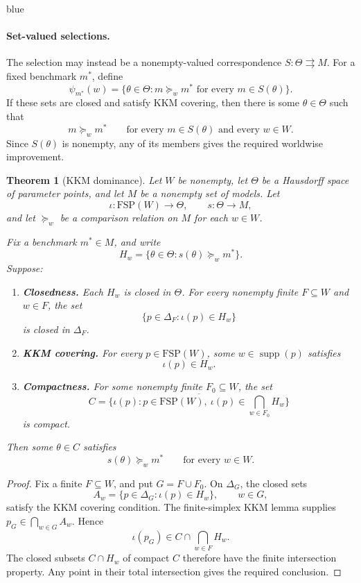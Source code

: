 \documentclass[11pt]{article}
\newtheorem{theorem}{Theorem}[section]
\theoremstyle{definition}
\theoremstyle{remark}
\newcommand{\supp}{\operatorname{supp}}
\newenvironment{AIwritten}{\begin{color}{blue}}{\end{color}}
\begin{document}
\begin{AIwritten}
\paragraph{Set-valued selections.}
The selection may instead be a nonempty-valued
correspondence $S:\Theta\rightrightarrows M$.
For a fixed benchmark $m^*$, define
\[
\psi_{m^*}(w)=
\{\theta\in \Theta:
m\succeq_w m^*
\text{ for every }m\in S(\theta)\}.
\]
If these sets are closed and satisfy KKM covering,
then there is some $\theta\in \Theta$ such that
\[
m\succeq_w m^*
\qquad
\text{for every }m\in S(\theta)
\text{ and every }w\in W.
\]
Since $S(\theta)$ is nonempty, any of its members gives
the required worldwise improvement.



\begin{theorem}[KKM dominance]\label{thm:dom}
	Let $W$ be nonempty, let $\Theta$ be a Hausdorff
	space of parameter points, and let $M$ be a
	nonempty set of models.
	Let
	\[
	\iota:\mathrm{FSP}(W)\to \Theta,
	\qquad s:\Theta\to M,
	\]
	and let $\succeq_w$ be a comparison relation on $M$
	for each $w\in W$.
	
	Fix a benchmark $m^*\in M$, and write
	\[
	H_w=\{\theta\in \Theta:s(\theta)\succeq_w m^*\}.
	\]
	Suppose:
	\begin{enumerate}
		\item \textbf{Closedness.}
		Each $H_w$ is closed in $\Theta$.
		For every nonempty finite $F\subseteq W$
		and $w\in F$, the set
		\[
		\{p\in\Delta_F:\iota(p)\in H_w\}
		\]
		is closed in $\Delta_F$.
		
		\item \textbf{KKM covering.}
		For every $p\in\mathrm{FSP}(W)$, some
		$w\in\supp(p)$ satisfies
		\[
		\iota(p)\in H_w.
		\]
		
		\item \textbf{Compactness.}
		For some nonempty finite $F_0\subseteq W$,
		the set
		\[
		C=\overline{
			\{\iota(p):p\in\mathrm{FSP}(W),\
			\iota(p)\in\bigcap_{w\in F_0}H_w\}
		}
		\]
		is compact.
	\end{enumerate}
	Then some $\theta\in C$ satisfies
	\[
	s(\theta)\succeq_w m^*
	\qquad\text{for every }w\in W.
	\]
\end{theorem}

\begin{proof}
	Fix a finite $F\subseteq W$, and put $G=F\cup F_0$.
	On $\Delta_G$, the closed sets
	\[
	A_w=\{p\in\Delta_G:\iota(p)\in H_w\},
	\qquad w\in G,
	\]
	satisfy the KKM covering condition.
	The finite-simplex KKM lemma supplies
	$p_G\in\bigcap_{w\in G}A_w$. Hence
	\[
	\iota(p_G)\in C\cap\bigcap_{w\in F}H_w.
	\]
	The closed subsets $C\cap H_w$ of compact $C$
	therefore have the finite intersection property.
	Any point in their total intersection gives
	the required conclusion.
\end{proof}

\end{AIwritten}
\end{document}
